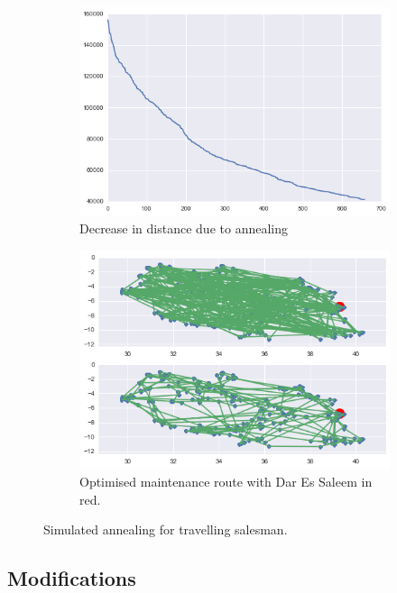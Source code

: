 \documentclass{article} %
\begin{document}
\begin{multicols}{2}
\begin{figure}
	\begin{subfigure}{0.5\textwidth}
		\includegraphics[width=\textwidth]{figures/Plain-TSP-Trace}
		\caption{Decrease in distance due to annealing}
		\label{fig:Plain-TSP-Trace}
	\end{subfigure}
	\begin{subfigure}{0.5\textwidth}
		\includegraphics[width=\textwidth]{figures/Optimised-Route}
		\caption{Optimised maintenance route with Dar Es Saleem in red.}
		\label{fig:trace_comp}
	\end{subfigure}
	\caption{Simulated annealing for travelling salesman.}
	\label{fig:TSP}
\end{figure}

\subsection{Modifications}


\end{multicols}
\end{document}
